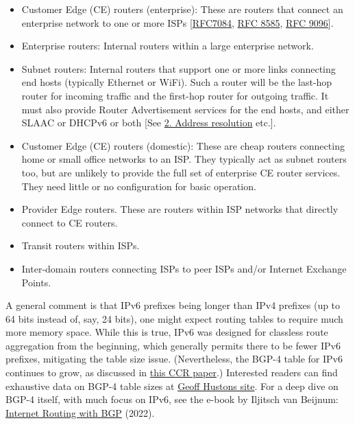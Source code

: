 \documentclass[
]{article}
\begin{document}
\begin{itemize}
\item
  Customer Edge (CE) routers (enterprise): These are routers that
  connect an enterprise network to one or more ISPs
  {[}\href{https://www.rfc-editor.org/info/rfc7084}{RFC7084},
  \href{https://www.rfc-editor.org/info/rfc8585}{RFC 8585},
  \href{https://www.rfc-editor.org/info/rfc9096}{RFC 9096}{]}.
\item
  Enterprise routers: Internal routers within a large enterprise
  network.
\item
  Subnet routers: Internal routers that support one or more links
  connecting end hosts (typically Ethernet or WiFi). Such a router will
  be the last-hop router for incoming traffic and the first-hop router
  for outgoing traffic. It must also provide Router Advertisement
  services for the end hosts, and either SLAAC or DHCPv6 or both {[}See
  \hyperref[address-resolution]{2. Address resolution} etc.{]}.
\item
  Customer Edge (CE) routers (domestic): These are cheap routers
  connecting home or small office networks to an ISP. They typically act
  as subnet routers too, but are unlikely to provide the full set of
  enterprise CE router services. They need little or no configuration
  for basic operation.
\item
  Provider Edge routers. These are routers within ISP networks that
  directly connect to CE routers.
\item
  Transit routers within ISPs.
\item
  Inter-domain routers connecting ISPs to peer ISPs and/or Internet
  Exchange Points.
\end{itemize}

A general comment is that IPv6 prefixes being longer than IPv4 prefixes
(up to 64 bits instead of, say, 24 bits), one might expect routing
tables to require much more memory space. While this is true, IPv6 was
designed for classless route aggregation from the beginning, which
generally permits there to be fewer IPv6 prefixes, mitigating the table
size issue. (Nevertheless, the BGP-4 table for IPv6 continues to grow,
as discussed in
\href{https://dl.acm.org/doi/10.1145/3477482.3477490}{this CCR paper}.)
Interested readers can find exhaustive data on BGP-4 table sizes at
\href{https://bgp.potaroo.net/index-bgp.html}{Geoff
Huston\textquotesingle s site}. For a deep dive on BGP-4 itself, with
much focus on IPv6, see the e-book by Iljitsch van Beijnum:
\href{https://www.iljitsch.com/2022/11-18-new-e-book-internet-routing-with-bgp.html}{Internet
Routing with BGP} (2022).
\end{document}

